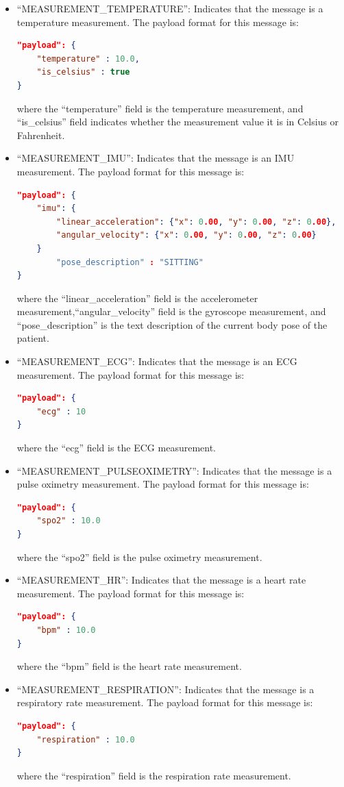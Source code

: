 \begin{itemize}
    \item ``MEASUREMENT\_TEMPERATURE'': Indicates that the message is a temperature measurement. The payload format for this message is:
        \begin{lstlisting}[language=json]            
"payload": {
    "temperature" : 10.0,
    "is_celsius" : true 
} 
        \end{lstlisting} 
        where the ``temperature'' field is the temperature measurement, and ``is\_celsius'' field indicates whether the measurement value it is in Celsius or Fahrenheit.
    
    \clearpage
        \item ``MEASUREMENT\_IMU'': Indicates that the message is an \acs{IMU} measurement. The payload format for this message is:
        \begin{lstlisting}[language=json]            
"payload": {
    "imu": {
        "linear_acceleration": {"x": 0.00, "y": 0.00, "z": 0.00},
        "angular_velocity": {"x": 0.00, "y": 0.00, "z": 0.00} 
    }
        "pose_description" : "SITTING"
} 
        \end{lstlisting} 
        where the ``linear\_acceleration'' field is the accelerometer measurement,``angular\_velocity'' field is the gyroscope measurement, and ``pose\_description'' is the text description of the current body pose of the patient.

    \item ``MEASUREMENT\_ECG'': Indicates that the message is an \acs{ECG} measurement. The payload format for this message is:
        \begin{lstlisting}[language=json]            
"payload": {
    "ecg" : 10
} 
        \end{lstlisting} 
        where the ``ecg'' field is the \acs{ECG} measurement.
    \item ``MEASUREMENT\_PULSEOXIMETRY'': Indicates that the message is a pulse oximetry measurement. The payload format for this message is:
        \begin{lstlisting}[language=json]            
"payload": {
    "spo2" : 10.0
} 
        \end{lstlisting} 
        where the ``spo2'' field is the pulse oximetry measurement.


    \item ``MEASUREMENT\_HR'': Indicates that the message is a heart rate measurement. The payload format for this message is:
        \begin{lstlisting}[language=json]            
"payload": {
    "bpm" : 10.0
} 
        \end{lstlisting} 
        where the ``bpm'' field is the heart rate measurement.


    \item ``MEASUREMENT\_RESPIRATION'': Indicates that the message is a respiratory rate measurement. The payload format for this message is:
        \begin{lstlisting}[language=json]            
"payload": {
    "respiration" : 10.0
} 
        \end{lstlisting} 
        where the ``respiration'' field is the respiration rate measurement.
\end{itemize}
